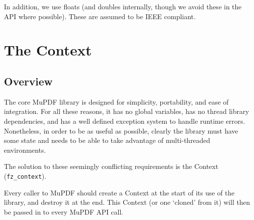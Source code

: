 \documentclass[oneside]{book}
\begin{document}
In addition, we use floats (and doubles internally, though we avoid these in the API where possible). These are assumed to be IEEE compliant.

\chapter{The Context}
\label{Context}

\section{Overview}

The core MuPDF library is designed for simplicity, portability, and ease of integration. For all these reasons, it has no global variables, has no thread library dependencies, and has a well defined exception system to handle runtime errors. Nonetheless, in order to be as useful as possible, clearly the library must have some state and needs to be able to take advantage of multi-threaded environments.

The solution to these seemingly conflicting requirements is the Context (\texttt{fz\_context}).

Every caller to MuPDF should create a Context at the start of its use of the library, and destroy it at the end. This Context (or one `cloned' from it) will then be passed in to every MuPDF API call.
\end{document}
